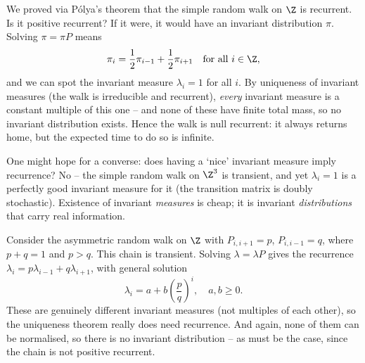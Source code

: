 \begin{example}
	We proved via Pólya's theorem that the simple random walk on $\Z$ is recurrent. Is it positive recurrent? If it were, it would have an invariant distribution $\pi$. Solving $\pi = \pi P$ means
	$$
	\pi_i = \frac{1}{2}\pi_{i - 1} + \frac{1}{2}\pi_{i + 1} \quad \text{for all } i \in \Z,
	$$
	and we can spot the invariant measure $\lambda_i = 1$ for all $i$. By uniqueness of invariant measures (the walk is irreducible and recurrent), \emph{every} invariant measure is a constant multiple of this one -- and none of these have finite total mass, so no invariant distribution exists. Hence the walk is null recurrent: it always returns home, but the expected time to do so is infinite.
\end{example}

\begin{remark}
	One might hope for a converse: does having a `nice' invariant measure imply recurrence? No -- the simple random walk on $\Z^3$ is transient, and yet $\lambda_i = 1$ is a perfectly good invariant measure for it (the transition matrix is doubly stochastic). Existence of invariant \emph{measures} is cheap; it is invariant \emph{distributions} that carry real information.
\end{remark}

\begin{example}
	Consider the asymmetric random walk on $\Z$ with $P_{i, i + 1} = p$, $P_{i, i - 1} = q$, where $p + q = 1$ and $p > q$. This chain is transient. Solving $\lambda = \lambda P$ gives the recurrence $\lambda_i = p\lambda_{i - 1} + q \lambda_{i + 1}$, with general solution
	$$
	\lambda_i = a + b \left(\frac{p}{q}\right)^i, \quad a, b \geq 0.
	$$
	These are genuinely different invariant measures (not multiples of each other), so the uniqueness theorem really does need recurrence. And again, none of them can be normalised, so there is no invariant distribution -- as must be the case, since the chain is not positive recurrent.
\end{example}

